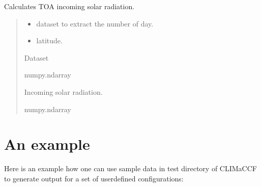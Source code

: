 \documentclass[a4paper,11pt,english]{sphinxmanual}
\begin{document}
\begin{fulllineitems}
\label{\detokenize{modules:climaccf.accf.get_Fin}}
\pysigstartsignatures
{}
\pysigstopsignatures
\sphinxAtStartPar
Calculates TOA incoming solar radiation.
\begin{quote}\begin{description}
\begin{itemize}
\item {} 
\sphinxAtStartPar
{} \textendash{} dataset to extract the number of day.

\item {} 
\sphinxAtStartPar
{} \textendash{} latitude.

\end{itemize}

\sphinxAtStartPar
Dataset

\sphinxAtStartPar
numpy.ndarray

\sphinxAtStartPar
Incoming solar radiation.

\sphinxAtStartPar
numpy.ndarray

\end{description}\end{quote}

\end{fulllineitems}



\chapter{An example}
\label{\detokenize{index:an-example}}
\sphinxAtStartPar
Here is an example how one can use sample data in test directory of CLIMaCCF to generate output for a set of user\sphinxhyphen{}defined configurations:
\end{document}

